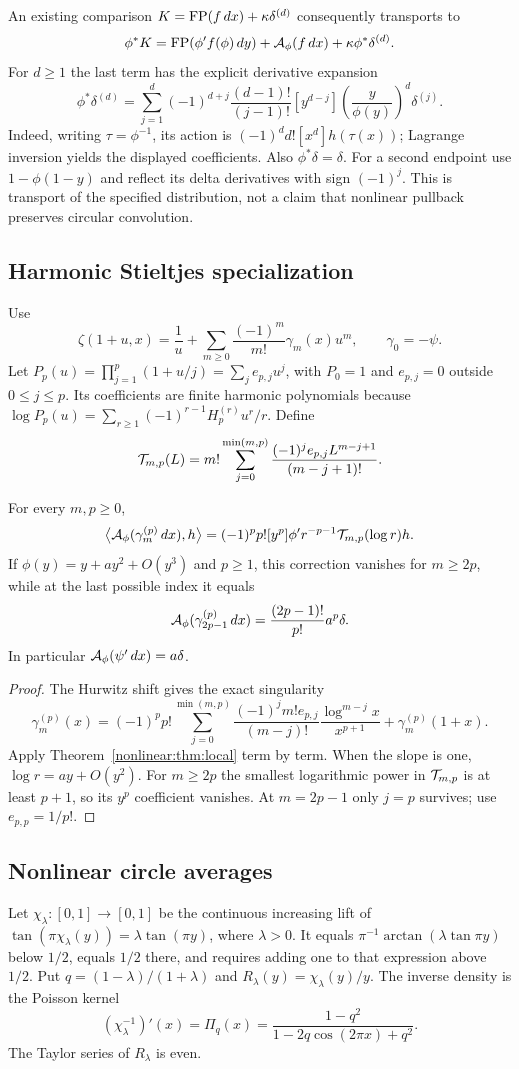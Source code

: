 An existing comparison $K=\operatorname{FP}(f\,dx)+\kappa\delta^{(d)}$ consequently
transports to
\[
\phi^*K=\operatorname{FP}(\phi'f(\phi)\,dy)
+\mathcal A_\phi(f\,dx)+\kappa\phi^*\delta^{(d)}.
\]
For $d\ge1$ the last term has the explicit derivative expansion
\[
\phi^*\delta^{(d)}=
\sum_{j=1}^d(-1)^{d+j}\frac{(d-1)!}{(j-1)!}
[y^{d-j}]\left(\frac y{\phi(y)}\right)^d\delta^{(j)}.
\]
Indeed, writing $\tau=\phi^{-1}$, its action is
$(-1)^dd![x^d]h(\tau(x))$; Lagrange inversion yields the displayed
coefficients. Also $\phi^*\delta=\delta$. For a second endpoint use
$1-\phi(1-y)$ and reflect its delta derivatives with sign $(-1)^j$.
This is transport of the specified distribution, not a claim that nonlinear
pullback preserves circular convolution.

\subsection{Harmonic Stieltjes specialization}
Use
\[
\zeta(1+u,x)=\frac1u+\sum_{m\ge0}\frac{(-1)^m}{m!}\gamma_m(x)u^m,
\qquad \gamma_0=-\psi.
\]
Let $P_p(u)=\prod_{j=1}^p(1+u/j)=\sum_je_{p,j}u^j$, with $P_0=1$ and
$e_{p,j}=0$ outside $0\le j\le p$. Its coefficients are finite harmonic
polynomials because
$\log P_p(u)=\sum_{r\ge1}(-1)^{r-1}H_p^{(r)}u^r/r$.
Define
\[
\mathcal T_{m,p}(L)=m!\sum_{j=0}^{\min(m,p)}
\frac{(-1)^je_{p,j}L^{m-j+1}}{(m-j+1)!}.
\]
\begin{nonlinearthm}
\label{nonlinear:thm:stieltjes}
For every $m,p\ge0$,
\[
\big\langle\mathcal A_\phi(\gamma_m^{(p)}\,dx),h\big\rangle
=(-1)^pp![y^p]\phi'r^{-p-1}\mathcal T_{m,p}(\log r)h.
\]
If $\phi(y)=y+ay^2+O(y^3)$ and $p\ge1$, this correction vanishes for
$m\ge2p$, while at the last possible index it equals
\[
\mathcal A_\phi(\gamma_{2p-1}^{(p)}\,dx)
=\frac{(2p-1)!}{p!}a^p\delta.
\]
In particular $\mathcal A_\phi(\psi'\,dx)=a\delta$.
\end{nonlinearthm}
\begin{proof}
The Hurwitz shift gives the exact singularity
\[
\gamma_m^{(p)}(x)=(-1)^pp!\sum_{j=0}^{\min(m,p)}
\frac{(-1)^jm!e_{p,j}}{(m-j)!}\frac{\log^{m-j}x}{x^{p+1}}
+\gamma_m^{(p)}(1+x).
\]
Apply Theorem~\ref{nonlinear:thm:local} term by term. When the slope is one,
$\log r=ay+O(y^2)$. For $m\ge2p$ the smallest logarithmic power in
$\mathcal T_{m,p}$ is at least $p+1$, so its $y^p$ coefficient vanishes. At
$m=2p-1$ only $j=p$ survives; use $e_{p,p}=1/p!$.
\end{proof}

\subsection{Nonlinear circle averages}
Let $\chi_\lambda:[0,1]\to[0,1]$ be the continuous increasing lift of
$\tan(\pi\chi_\lambda(y))=\lambda\tan(\pi y)$, where $\lambda>0$.
It equals $\pi^{-1}\arctan(\lambda\tan\pi y)$ below $1/2$, equals $1/2$
there, and requires adding one to that expression above $1/2$.
Put $q=(1-\lambda)/(1+\lambda)$ and $R_\lambda(y)=\chi_\lambda(y)/y$.
The inverse density is the Poisson kernel
\[
(\chi_\lambda^{-1})'(x)=\Pi_q(x)
=\frac{1-q^2}{1-2q\cos(2\pi x)+q^2}.
\]
The Taylor series of $R_\lambda$ is even.


